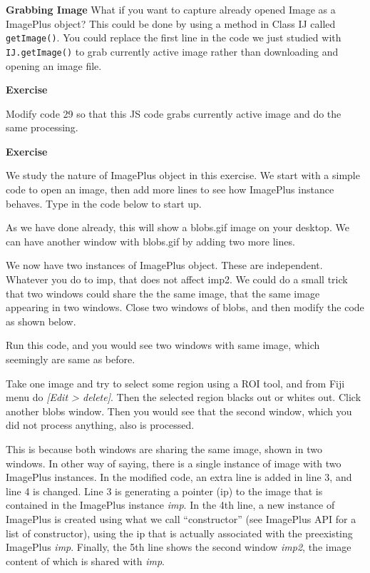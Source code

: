 \documentclass[11pt,a4paper,oneside]{report}
\newenvironment{indentexercise}[1]%
{{\setlength{\leftmargin}{2em}}%
\textbf{Exercise \thesubsection-#1}%
\begin{list}{}%
	\item%
}
{\end{list}}
\newcommand{\ijmenu}[1]{\texttt{\small#1}}
\newcommand{\ilcom}[1]{\texttt{\small#1}}
\begin{document}

\textbf{Grabbing Image}
What if you want to capture already opened Image as a ImagePlus object? 
This could be done by using a method in Class IJ called \ilcom{getImage()}. 
You could replace the first line in the code we just studied with \ilcom{IJ.getImage()} 
to grab currently active image rather than downloading and opening an image file. 

\begin{indentexercise}{1}
Modify code 29 so that this JS code grabs currently active image and do the same processing. 
\end{indentexercise}

\begin{indentexercise}{2}
We study the nature of ImagePlus object in this exercise. We start with a simple
code to open an image, then add more lines to see how ImagePlus instance
behaves. Type in the code below to start up. 



As we have done already, this will show a blobs.gif image on your desktop. We
can have another window with blobs.gif by adding two more lines. 



We now have two instances of ImagePlus object. These are independent. 
Whatever you do to imp, that does not affect imp2. We could do a small trick
that two windows could share the the same image, that the same image appearing
in two windows. Close two windows of blobs, and then modify the code as shown
below.



Run this code, and you would see two windows with same image, which seemingly
are same as before. 

Take one image and try to select some region using a ROI tool,
and from Fiji menu do \textit{[Edit > delete]}. Then the selected region blacks
out or whites out. Click another blobs window. Then you would see that the
second window, which you did not process anything, also is processed. 

This is because both windows are sharing the same image, shown in two windows.
In other way of saying, there is a single instance of image with two ImagePlus
instances. In the modified code, an extra line is added in line 3, and line 4 is
changed. Line 3 is generating a pointer (ip) to the image that is contained in
the ImagePlus instance \textit{imp}. In the 4th line, a new instance of
ImagePlus is created using what we call ``constructor'' (see ImagePlus API for
a list of constructor), using the ip that is actually associated with the
preexisting ImagePlus \textit{imp}. Finally, the 5th line shows the second
window \textit{imp2}, the image content of which is shared with \textit{imp}. 
 
\end{indentexercise}
\end{document}
